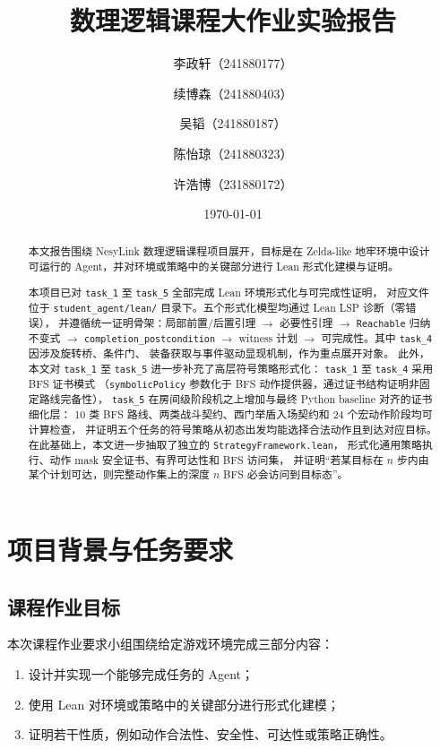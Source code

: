 \documentclass[12pt,a4paper]{ctexart}
\title{数理逻辑课程大作业实验报告}
\author{李政轩（241880177） \and 续博森（241880403） \and 吴韬（241880187） \and 陈怡琼（241880323） \and 许浩博（231880172）}
\date{\today}
\begin{document}
\maketitle

\begin{abstract}
本文报告围绕 NesyLink 数理逻辑课程项目展开，目标是在 Zelda-like 地牢环境中设计可运行的 Agent，并对环境或策略中的关键部分进行 Lean 形式化建模与证明。

本项目已对 \texttt{task\_1} 至 \texttt{task\_5} 全部完成 Lean 环境形式化与可完成性证明，
对应文件位于 \texttt{student\_agent/lean/} 目录下。五个形式化模型均通过 Lean LSP 诊断（零错误），
并遵循统一证明骨架：局部前置/后置引理 $\rightarrow$ 必要性引理 $\rightarrow$
\texttt{Reachable} 归纳不变式 $\rightarrow$ \texttt{completion\_postcondition} $\rightarrow$
witness 计划 $\rightarrow$ 可完成性。其中 \texttt{task\_4} 因涉及旋转桥、条件门、
装备获取与事件驱动显现机制，作为重点展开对象。
此外，本文对 \texttt{task\_1} 至 \texttt{task\_5} 进一步补充了高层符号策略形式化：
\texttt{task\_1} 至 \texttt{task\_4} 采用 BFS 证书模式
（\texttt{symbolicPolicy} 参数化于 BFS 动作提供器，通过证书结构证明非固定路线完备性），
\texttt{task\_5} 在房间级阶段机之上增加与最终 Python baseline 对齐的证书细化层：
10 类 BFS 路线、两类战斗契约、西门举盾入场契约和 24 个宏动作阶段均可计算检查，
并证明五个任务的符号策略从初态出发均能选择合法动作且到达对应目标。
在此基础上，本文进一步抽取了独立的 \texttt{StrategyFramework.lean}，
形式化通用策略执行、动作 mask 安全证书、有界可达性和 BFS 访问集，
并证明“若某目标在 $n$ 步内由某个计划可达，则完整动作集上的深度 $n$ BFS 必会访问到目标态”。
\end{abstract}

\tableofcontents
\newpage

\section{项目背景与任务要求}

\subsection{课程作业目标}

本次课程作业要求小组围绕给定游戏环境完成三部分内容：
\begin{enumerate}[leftmargin=2em]
  \item 设计并实现一个能够完成任务的 Agent；
  \item 使用 Lean 对环境或策略中的关键部分进行形式化建模；
  \item 证明若干性质，例如动作合法性、安全性、可达性或策略正确性。
\end{enumerate}
\end{document}
